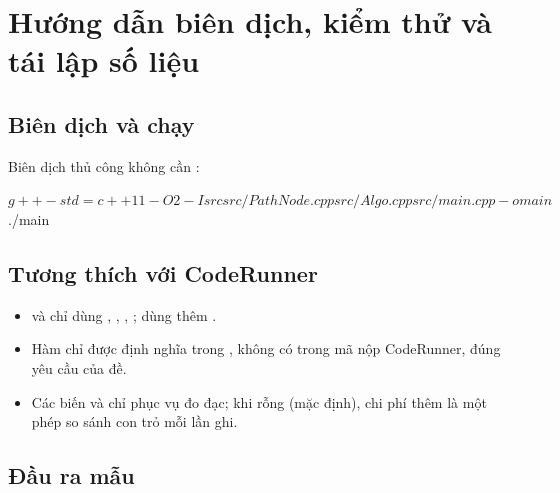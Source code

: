 \chapter{Hướng dẫn biên dịch, kiểm thử và tái lập số liệu}
\label{app:huong-dan}

\section{Biên dịch và chạy}


Biên dịch thủ công không cần :

\begin{khungbash}
$ g++ -std=c++11 -O2 -Isrc src/PathNode.cpp src/Algo.cpp src/main.cpp -o main
$ ./main
\end{khungbash}

\section{Tương thích với CodeRunner}

\begin{itemize}
  \item {} và  chỉ dùng , ,
        , ;  dùng thêm .
  \item Hàm  chỉ được định nghĩa trong , không có trong mã nộp
        CodeRunner, đúng yêu cầu của đề.
  \item Các biến  và  chỉ phục vụ đo đạc; khi
         rỗng (mặc định), chi phí thêm là một phép so sánh con trỏ mỗi lần ghi.
\end{itemize}

\section{Đầu ra mẫu}

